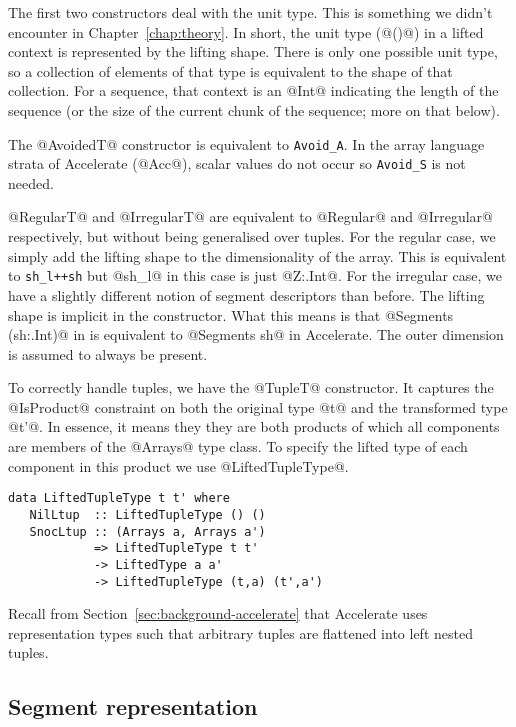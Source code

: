 The first two constructors deal with the unit type. This is something we didn't encounter in Chapter~\ref{chap:theory}. In short, the unit type (@()@) in a lifted context is represented by the lifting shape. There is only one possible unit type, so a collection of elements of that type is equivalent to the shape of that collection. For a sequence, that context is an @Int@ indicating the length of the sequence (or the size of the current chunk of the sequence; more on that below).

The @AvoidedT@ constructor is equivalent to \lstinline[style=ndp]{Avoid_A}. In the array language strata of Accelerate (@Acc@), scalar values do not occur so \lstinline[style=ndp]{Avoid_S} is not needed.

@RegularT@ and @IrregularT@ are equivalent to @Regular@ and @Irregular@ respectively, but without being generalised over tuples. For the regular case, we simply add the lifting shape to the dimensionality of the array. This is equivalent to \lstinline[style=ndp]{sh_l++sh} but @sh_l@ in this case is just @Z:.Int@. For the irregular case, we have a slightly different notion of segment descriptors than before. The lifting shape is implicit in the constructor. What this means is that @Segments (sh:.Int)@ in \ndp{} is equivalent to @Segments sh@ in Accelerate. The outer dimension is assumed to always be present.

To correctly handle tuples, we have the @TupleT@ constructor. It captures the @IsProduct@ constraint on both the original type @t@ and the transformed type @t'@. In essence, it means they they are both products of which all components are members of the @Arrays@ type class. To specify the lifted type of each component in this product we use @LiftedTupleType@.
%
\begin{lstlisting}
data LiftedTupleType t t' where
   NilLtup  :: LiftedTupleType () ()
   SnocLtup :: (Arrays a, Arrays a')
            => LiftedTupleType t t'
            -> LiftedType a a'
            -> LiftedTupleType (t,a) (t',a')
\end{lstlisting}
%
Recall from Section~\ref{sec:background-accelerate} that Accelerate uses representation types such that arbitrary tuples are flattened into left nested tuples.

\subsection{Segment representation}

